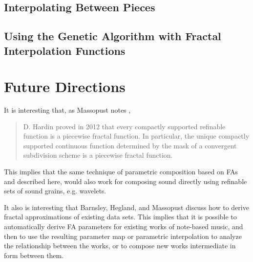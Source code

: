 \documentclass[english,11pt,letterpaper,onecolumn]{scrartcl}
\begin{document}
\subsection{Interpolating Between Pieces}


\subsection{Using the Genetic Algorithm with Fractal Interpolation Functions}

\section{Future Directions}

It is interesting that, as Massopust notes \cite{massopust2017}, 
\begin{quote}D. Hardin proved in 2012 that every compactly supported 
refinable function is a piecewise fractal function. In particular, the unique 
compactly supported continuous function determined by the mask of a convergent 
subdivision scheme is a piecewise fractal function. \end{quote} 
This implies that the same technique of parametric 
composition based on FAs and described here, would also work for composing 
sound directly using refinable sets of sound grains, e.g. wavelets.

It also is interesting that Barnsley, Hegland, and Massopust 
\cite{2013arXiv1309.0972B} discuss how to derive fractal approximations of 
existing data sets. This implies that it is possible to automatically derive 
FA parameters for existing works of note-based music, and then to use the 
resulting parameter map or parametric interpolation to analyze the 
relationship between the works, or to compose new works intermediate in form 
between them.

% 
%
\printbibliography
\end{document}
